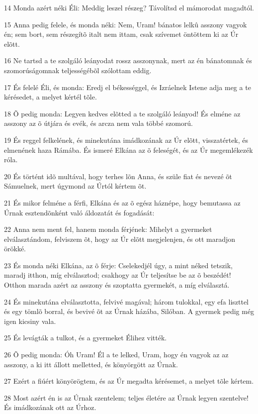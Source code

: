 \par 14 Monda azért néki Éli: Meddig leszel részeg? Távolítsd el mámorodat magadtól.
\par 15 Anna pedig felele, és monda néki: Nem, Uram! bánatos lelkû asszony vagyok én; sem bort, sem részegítõ italt nem ittam, csak szívemet öntöttem ki az Úr elõtt.
\par 16 Ne tartsd a te szolgáló leányodat rossz asszonynak, mert az én bánatomnak és szomorúságomnak teljességébõl szólottam eddig.
\par 17 És felelé Éli, és monda: Eredj el békességgel, és Izráelnek Istene adja meg a te kérésedet, a melyet kértél tõle.
\par 18 Õ pedig monda: Legyen kedves elõtted a te szolgáló leányod! És elméne az asszony az õ útjára és evék, és arcza nem vala többé szomorú.
\par 19 És reggel felkelének, és minekutána imádkozának az Úr elõtt, visszatértek, és elmenének haza Rámába. És ismeré Elkána az õ feleségét, és az Úr megemlékezék róla.
\par 20 És történt idõ multával, hogy terhes lõn Anna, és szüle fiat és nevezé õt Sámuelnek, mert úgymond az Úrtól kértem õt.
\par 21 És mikor felméne a férfi, Elkána és az õ egész háznépe, hogy bemutassa az Úrnak esztendõnként való áldozatát és fogadását:
\par 22 Anna nem ment fel, hanem monda férjének: Mihelyt a gyermeket elválasztándom, felviszem õt, hogy az Úr elõtt megjelenjen, és ott maradjon örökké.
\par 23 És monda néki Elkána, az õ férje: Cselekedjél úgy, a mint néked tetszik, maradj itthon, míg elválasztod; csakhogy az Úr teljesítse be az õ beszédét! Otthon marada azért az asszony és szoptatta gyermekét, a míg elválasztá.
\par 24 És minekutána elválasztotta, felvivé magával; három tulokkal, egy efa liszttel és egy tömlõ borral, és bevivé õt az Úrnak házába, Silóban. A gyermek pedig még igen kicsiny vala.
\par 25 És levágták a tulkot, és a gyermeket Élihez vitték.
\par 26 Õ pedig monda: Óh Uram! Él a te lelked, Uram, hogy én vagyok az az asszony, a ki itt állott melletted, és könyörgött az Úrnak.
\par 27 Ezért a fiúért könyörögtem, és az Úr megadta kérésemet, a melyet tõle kértem.
\par 28 Most azért én is az Úrnak szentelem; teljes életére az Úrnak legyen szentelve! És imádkozának ott az Úrhoz.

